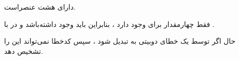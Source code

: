 \begin{boxK}
    دارای هشت عنصراست.

    فقط چهارمقدار برای
    وجود دارد ، بنابراین باید
    وجود داشته‌باشد و
    در
    با
    .

    حال اگر 
    توسط یک خطای دوبیتی به
    تبدیل شود ، 
    سپس کدخطا 
    نمی‌تواند این را تشخیص دهد.

    
    
\end{boxK}